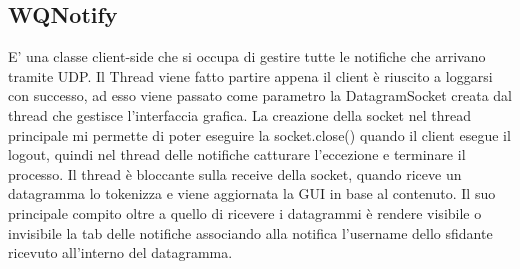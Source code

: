 \documentclass{article}
\begin{document}
\subsection{WQNotify}
E' una classe client-side che si occupa di gestire tutte le notifiche che arrivano tramite UDP. Il Thread viene fatto partire appena il client è riuscito a loggarsi con successo, ad esso viene passato come parametro la DatagramSocket creata dal thread che gestisce l'interfaccia grafica. La creazione della socket nel thread principale mi permette di poter eseguire la socket.close() quando il client esegue il logout, quindi nel thread delle notifiche catturare l'eccezione e terminare il processo. Il thread è bloccante sulla receive della socket, quando riceve un datagramma lo tokenizza e viene aggiornata la GUI in base al contenuto. Il suo principale compito oltre a quello di ricevere i datagrammi è rendere visibile o invisibile la tab delle notifiche associando alla notifica l'username dello sfidante ricevuto all'interno del datagramma.
\end{document}
